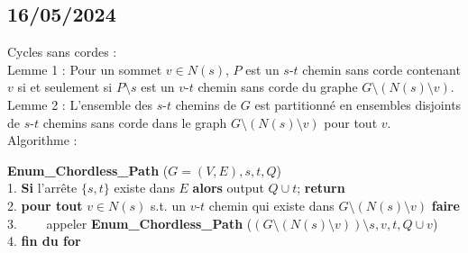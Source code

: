 \documentclass[11pt]{article}
\begin{document}
\begin{itemize}
\section{16/05/2024}
Cycles sans cordes : \\
Lemme 1 :		    Pour un sommet $v\in N(s)$,
 $P$ est un $s$-$t$ chemin sans corde contenant $v$ si et seulement si
 $P\setminus s$ est un $v$-$t$ chemin sans corde du graphe
 $G\setminus (N(s) \setminus v)$. \\


Lemme 2 : L'ensemble des $s$-$t$ chemins de $G$ est partitionné en ensembles disjoints de $s$-$t$ chemins sans corde dans le graph
 $G\setminus (N(s) \setminus v)$ pour tout $v$. \\

\newpage
Algorithme : \\
\begin{tabbing}
{\bf Enum\_Chordless\_Path} ($G=(V,E), s, t, Q$)\\
1. {\bf Si} l'arrête $\{ s, t\}$ existe dans $E$ {\bf alors} output $Q \cup t$;
 {\bf return}\\
2. {\bf pour tout} $v\in N(s)$ s.t. un $v$-$t$ chemin qui existe dans
 $G\setminus (N(s) \setminus v)$ {\bf faire}\\
3. \ \  \ \ appeler {\bf Enum\_Chordless\_Path} ($(G\setminus (N(s)\setminus
  v))\setminus s, v, t, Q\cup v$)\\
4. {\bf fin du for}
\end{tabbing}

	
   

    \end{itemize}

    
\end{document}
